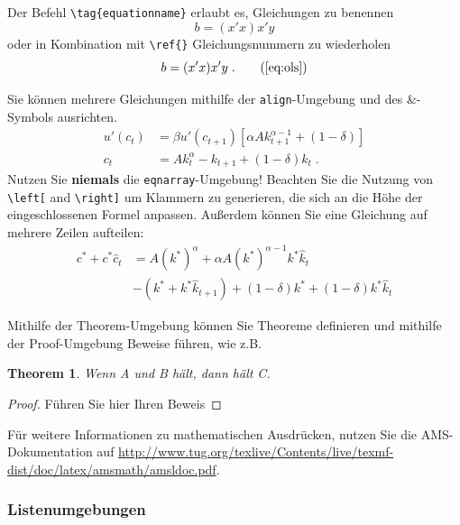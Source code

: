 \documentclass[a4paper,12pt]{scrartcl} %
\newtheorem{theorem}{Theorem} %
\begin{document}
Der Befehl \verb|\tag{equationname}| erlaubt es, Gleichungen zu benennen
\begin{equation}
	b = (x'x)x'y \tag{OLS Estimator}
\end{equation}
oder in Kombination mit \verb|\ref{}| Gleichungsnummern zu wiederholen
\begin{equation}
	b = (x'x)x'y \;. \tag{\ref{eq:ols}}
\end{equation}

Sie können mehrere Gleichungen mithilfe der \texttt{align}-Umgebung und des \&-Symbols ausrichten.
\begin{align}
	u'(c_t)&= \beta u'(c_{t+1}) \left[\alpha A k_{t+1}^{\alpha-1} +(1-\delta)\right] \label{euler}\\
    c_t &=Ak_t^{\alpha} - k_{t+1} + (1-\delta)k_t \;.\label{ressource}
\end{align}
Nutzen Sie \textbf{niemals} die \texttt{eqnarray}-Umgebung! Beachten Sie die Nutzung von \verb|\left[| and \verb|\right]| um Klammern zu generieren, die sich an die Höhe der eingeschlossenen Formel anpassen. Außerdem können Sie eine Gleichung auf mehrere Zeilen aufteilen:
\begin{equation}
	\begin{split}
        c^* + c^* \hat{c}_{t} &= A\left(k^*\right)^{\alpha} + \alpha A \left(k^*\right)^{\alpha-1} k^* \hat{k}_t \\
                              &- \left( k^* + k^* \hat{k}_{t+1}\right) + (1-\delta)k^* + (1-\delta) k^* \hat{k}_t
    \end{split}
\end{equation}

Mithilfe der Theorem-Umgebung können Sie Theoreme definieren und mithilfe der Proof-Umgebung Beweise führen, wie z.B.\
\begin{theorem}
Wenn A und B hält, dann hält C.
\end{theorem}

\begin{proof}
Führen Sie hier Ihren Beweis
\end{proof}

Für weitere Informationen zu mathematischen Ausdrücken, nutzen Sie die AMS-Dokumentation auf \url{http://www.tug.org/texlive/Contents/live/texmf-dist/doc/latex/amsmath/amsldoc.pdf}.

\subsubsection*{Listenumgebungen}
\end{document}
